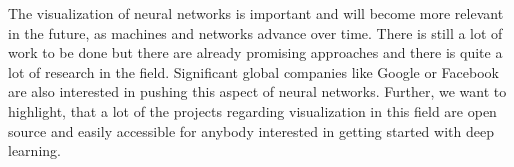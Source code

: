 \documentclass{acmsiggraph}               %
\begin{document}
The visualization of neural networks is important and will become more relevant in the future, as machines and networks advance over time. There is still a lot of work to be done but there are already promising approaches and there is quite a lot of research in the field. Significant global companies like Google or Facebook are also interested in pushing this aspect of neural networks. Further, we want to highlight, that a lot of the projects regarding visualization in this field are open source and easily accessible for anybody interested in getting started with deep learning. 


\nocite{*}

\end{document}

